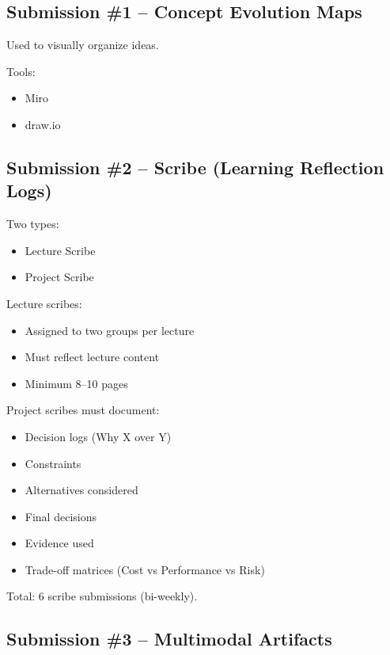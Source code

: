 \documentclass[11pt]{article}
\begin{document}
\subsection*{Submission \#1 – Concept Evolution Maps}

Used to visually organize ideas.

Tools:

\begin{itemize}
\item Miro
\item draw.io
\end{itemize}

\subsection*{Submission \#2 – Scribe (Learning Reflection Logs)}

Two types:

\begin{itemize}
\item Lecture Scribe
\item Project Scribe
\end{itemize}

Lecture scribes:

\begin{itemize}
\item Assigned to two groups per lecture
\item Must reflect lecture content
\item Minimum 8–10 pages
\end{itemize}

Project scribes must document:

\begin{itemize}
\item Decision logs (Why X over Y)
\item Constraints
\item Alternatives considered
\item Final decisions
\item Evidence used
\item Trade-off matrices (Cost vs Performance vs Risk)
\end{itemize}

Total: 6 scribe submissions (bi-weekly).

\subsection*{Submission \#3 – Multimodal Artifacts}
\end{document}
